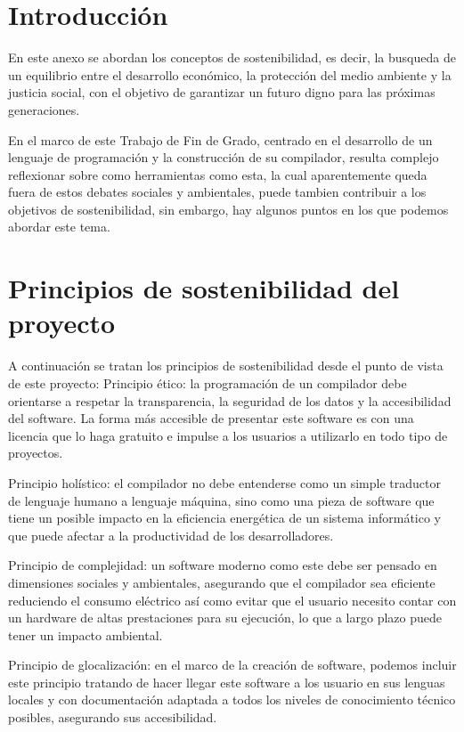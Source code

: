 
\section{Introducción}
En este anexo se abordan los conceptos de sostenibilidad, es decir, la busqueda de un equilibrio entre el desarrollo económico, la protección del medio ambiente y la justicia social, con el objetivo de garantizar un futuro digno para las próximas generaciones. 

En el marco de este Trabajo de Fin de Grado, centrado en el desarrollo de un lenguaje de programación y la construcción de su compilador, resulta complejo reflexionar sobre como herramientas como esta, la cual aparentemente queda fuera de estos debates sociales y ambientales, puede tambien contribuir a los objetivos de sostenibilidad, sin embargo, hay algunos puntos en los que podemos abordar este tema.

\section{Principios de sostenibilidad del proyecto}
A continuación se tratan los principios de sostenibilidad desde el punto de vista de este proyecto:
Principio ético: la programación de un compilador debe orientarse a respetar la transparencia, la seguridad de los datos y la accesibilidad del software. La forma más accesible de presentar este software es con una licencia que lo haga gratuito e impulse a los usuarios a utilizarlo en todo tipo de proyectos.

Principio holístico: el compilador no debe entenderse como un simple traductor de lenguaje humano a lenguaje máquina, sino como una pieza de software que tiene un posible impacto en la eficiencia energética de un sistema informático y que puede afectar a la productividad de los desarrolladores.

Principio de complejidad: un software moderno como este debe ser pensado en dimensiones sociales y ambientales, asegurando que el compilador sea eficiente reduciendo el consumo eléctrico así como evitar que el usuario necesito contar con un hardware de altas prestaciones para su ejecución, lo que a largo plazo puede tener un impacto ambiental.

Principio de glocalización: en el marco de la creación de software, podemos incluir este principio tratando de hacer llegar este software a los usuario en sus lenguas locales y con documentación adaptada a todos los niveles de conocimiento técnico posibles, asegurando sus accesibilidad.

